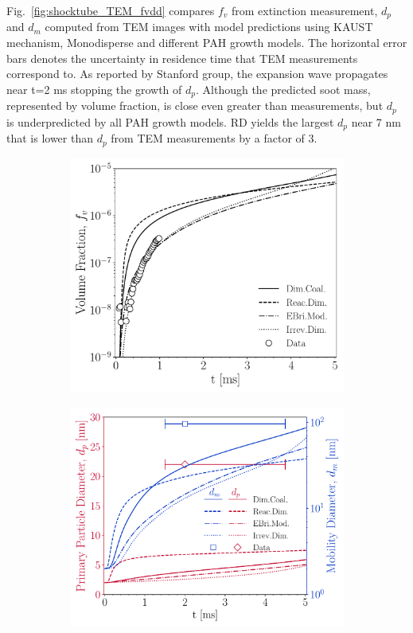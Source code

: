 Fig.~\ref{fig:shocktube_TEM_fvdd} compares $f_v$ from extinction measurement, $d_p$ and $d_m$ computed from TEM images with model predictions using KAUST mechanism, Monodisperse and different PAH growth models. The horizontal error bars denotes the uncertainty in residence time that TEM measurements correspond to. As reported by Stanford group, the expansion wave propagates near t=2 ms stopping the growth of $d_p$. Although the predicted soot mass, represented by volume fraction, is close even greater than measurements, but $d_p$ is underpredicted by all PAH growth models. RD yields the largest $d_p$ near 7 nm that is lower than $d_p$ from TEM measurements by a factor of 3.

\begin{figure}[H]
	\centering
	\begin{subfigure}[t]{0.3\textwidth}
		\includegraphics[width=1\textwidth]{Figures/Results/Shocktube/Stanford/TEM/vf_TEM.pdf}
	\end{subfigure}
	\begin{subfigure}[t]{0.32\textwidth}
		\includegraphics[width=1\textwidth]{Figures/Results/Shocktube/Stanford/TEM/dp_dm_TEM.pdf}

\end{subfigure}
\end{figure}

